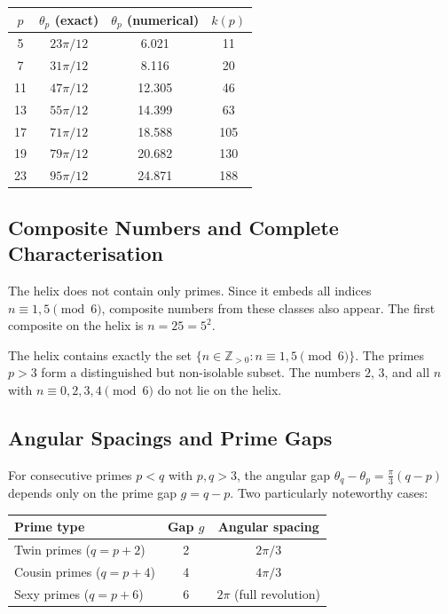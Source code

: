\begin{example}
\begin{center}
\begin{tabular}{cccc}
\toprule
$p$ & $\theta_p$ (exact) & $\theta_p$ (numerical) & $k(p)$ \\
\midrule
 5 & $23\pi/12$ &  6.021 &  11 \\
 7 & $31\pi/12$ &  8.116 &  20 \\
11 & $47\pi/12$ & 12.305 &  46 \\
13 & $55\pi/12$ & 14.399 &  63 \\
17 & $71\pi/12$ & 18.588 & 105 \\
19 & $79\pi/12$ & 20.682 & 130 \\
23 & $95\pi/12$ & 24.871 & 188 \\
\bottomrule
\end{tabular}
\end{center}
\end{example}

\subsection{Composite Numbers and Complete Characterisation}

The helix does not contain only primes. Since it embeds all indices
$n \equiv 1, 5 \pmod{6}$, composite numbers from these classes also
appear. The first composite on the helix is $n = 25 = 5^2$.

\begin{remark}
The helix contains exactly the set
$\{n \in \mathbb{Z}_{>0} : n \equiv 1, 5 \pmod{6}\}$.
The primes $p > 3$ form a distinguished but non-isolable subset.
The numbers $2$, $3$, and all $n$ with $n \equiv 0, 2, 3, 4 \pmod{6}$
do not lie on the helix.
\end{remark}

\subsection{Angular Spacings and Prime Gaps}

For consecutive primes $p < q$ with $p, q > 3$, the angular gap
$\theta_q - \theta_p = \frac{\pi}{3}(q-p)$ depends only on the
prime gap $g = q - p$. Two particularly noteworthy cases:

\begin{center}
\begin{tabular}{lcc}
\toprule
Prime type & Gap $g$ & Angular spacing \\
\midrule
Twin primes ($q = p+2$) & 2 & $2\pi/3$ \\
Cousin primes ($q = p+4$) & 4 & $4\pi/3$ \\
Sexy primes ($q = p+6$) & 6 & $2\pi$ (full revolution) \\
\bottomrule
\end{tabular}
\end{center}

